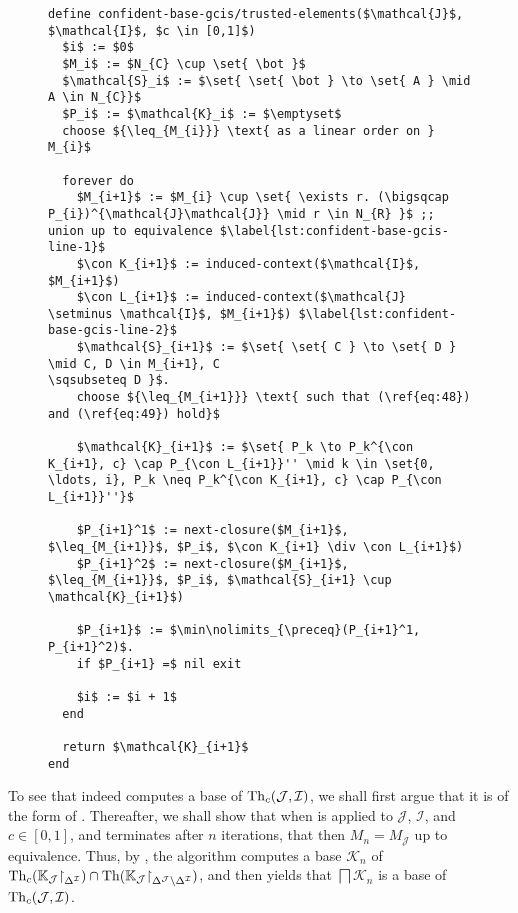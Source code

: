 
\begin{figure}[tp]
  \begin{Algorithm}
    \hspace*{0cm}
    \label{alg:confident-base-gcis/trusted-objects}
    \begin{lstlisting}
define confident-base-gcis/trusted-elements($\mathcal{J}$, $\mathcal{I}$, $c \in [0,1]$)
  $i$ := $0$
  $M_i$ := $N_{C} \cup \set{ \bot }$
  $\mathcal{S}_i$ := $\set{ \set{ \bot } \to \set{ A } \mid A \in N_{C}}$
  $P_i$ := $\mathcal{K}_i$ := $\emptyset$
  choose ${\leq_{M_{i}}} \text{ as a linear order on } M_{i}$
  
  forever do
    $M_{i+1}$ := $M_{i} \cup \set{ \exists r. (\bigsqcap P_{i})^{\mathcal{J}\mathcal{J}} \mid r \in N_{R} }$ ;; union up to equivalence $\label{lst:confident-base-gcis-line-1}$
    $\con K_{i+1}$ := induced-context($\mathcal{I}$, $M_{i+1}$)
    $\con L_{i+1}$ := induced-context($\mathcal{J} \setminus \mathcal{I}$, $M_{i+1}$) $\label{lst:confident-base-gcis-line-2}$
    $\mathcal{S}_{i+1}$ := $\set{ \set{ C } \to \set{ D } \mid C, D \in M_{i+1}, C
\sqsubseteq D }$.
    choose ${\leq_{M_{i+1}}} \text{ such that (\ref{eq:48}) and (\ref{eq:49}) hold}$

    $\mathcal{K}_{i+1}$ := $\set{ P_k \to P_k^{\con K_{i+1}, c} \cap P_{\con L_{i+1}}'' \mid k \in \set{0, \ldots, i}, P_k \neq P_k^{\con K_{i+1}, c} \cap P_{\con L_{i+1}}''}$

    $P_{i+1}^1$ := next-closure($M_{i+1}$, $\leq_{M_{i+1}}$, $P_i$, $\con K_{i+1} \div \con L_{i+1}$)
    $P_{i+1}^2$ := next-closure($M_{i+1}$, $\leq_{M_{i+1}}$, $P_i$, $\mathcal{S}_{i+1} \cup \mathcal{K}_{i+1}$)

    $P_{i+1}$ := $\min\nolimits_{\preceq}(P_{i+1}^1, P_{i+1}^2)$.
    if $P_{i+1} =$ nil exit

    $i$ := $i + 1$
  end

  return $\mathcal{K}_{i+1}$  
end
    \end{lstlisting}
  \end{Algorithm}
\end{figure}

To see that  indeed computes a base of
$\operatorname{Th}_{c}(\mathcal{J}, \mathcal{I})$, we shall first argue that it is of the form of
.  Thereafter, we shall show
that when  is applied to $\mathcal{J}$,
$\mathcal{I}$, and $c \in [0,1]$, and terminates after $n$ iterations, that then $M_{n} =
M_{\mathcal{J}}$ up to equivalence.  Thus, by
, the
algorithm computes a base $\mathcal{K}_{n}$ of $\operatorname{Th}_{c}({\mathbb{K}}_{\mathcal{J}}
\mathord{\upharpoonright}_{\Delta^{\mathcal{I}}}) \cap \operatorname{Th}({\mathbb{K}}_{\mathcal{J}}
\mathord{\upharpoonright}_{\Delta^{\mathcal{J}} \setminus \Delta^{\mathcal{I}}})$, and then
 yields that
$\bigsqcap \mathcal{K}_{n}$ is a base of $\operatorname{Th}_{c}(\mathcal{J}, \mathcal{I})$.

